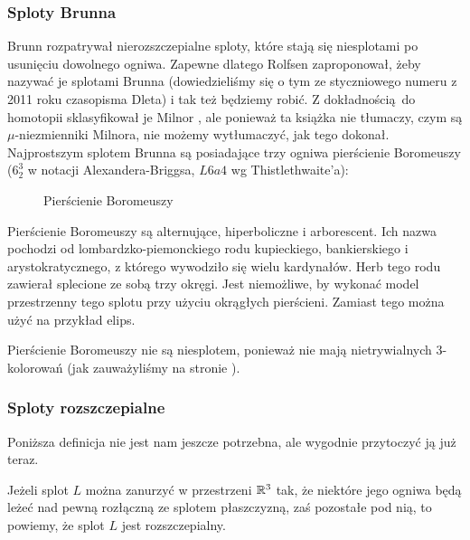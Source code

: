 \subsubsection{Sploty Brunna}
Brunn \cite{brunn1892} rozpatrywał nierozszczepialne sploty, które stają się niesplotami po usunięciu dowolnego ogniwa.
Zapewne dlatego Rolfsen zaproponował, żeby nazywać je splotami Brunna (dowiedzieliśmy się o tym ze styczniowego numeru z 2011 roku czasopisma Dleta) i tak też będziemy robić.
%
Z dokładnością do homotopii sklasyfikował je Milnor \cite{milnor1954}, ale ponieważ ta książka nie tłumaczy, czym są $\mu$-niezmienniki Milnora, nie możemy wytłumaczyć, jak tego dokonał.
%
Najprostszym splotem Brunna są posiadające trzy ogniwa pierścienie Boromeuszy ($6_2^3$ w notacji Alexandera-Briggsa, $L6a4$ wg Thistlethwaite'a):
\begin{figure}[H]
    \centering

    \caption[brunn-links]{Pierścienie Boromeuszy}
\end{figure}
Pierścienie Boromeuszy są alternujące, hiperboliczne i arborescent.
Ich nazwa pochodzi od lombardzko-piemonckiego rodu kupieckiego, bankierskiego i arystokratycznego, z którego wywodziło się wielu kardynałów.
Herb tego rodu zawierał splecione ze sobą trzy okręgi.
Jest niemożliwe, by wykonać model przestrzenny tego splotu przy użyciu okrągłych pierścieni.
Zamiast tego można użyć na przykład elips.

Pierścienie Boromeuszy nie są niesplotem, ponieważ nie mają nietrywialnych 3-kolorowań (jak zauważyliśmy na stronie \pageref{boromean_not_splittable}).

\subsubsection{Sploty rozszczepialne}

Poniższa definicja nie jest nam jeszcze potrzebna, ale wygodnie przytoczyć ją już teraz.

\begin{definition}[rozszczepialność]
%
    Jeżeli splot $L$ można zanurzyć w przestrzeni $\mathbb R^3$ tak, że niektóre jego ogniwa będą leżeć nad pewną rozłączną ze splotem płaszczyzną, zaś pozostałe pod nią, to powiemy, że splot $L$ jest rozszczepialny.
\end{definition}

